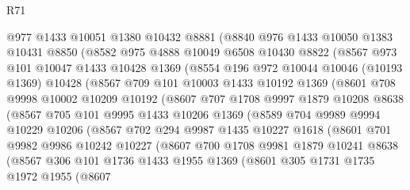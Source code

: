 \begin{lexlean}{R71}
\begin{coremodule}
      @977
      @1433
      @10051
      @1380
      @10432
      @8881
      (@8840
        @976
        @1433
        @10050
        @1383
        @10431
        @8850
        (@8582
          @975
          @4888
          @10049
          @6508
          @10430
          @8822
          (@8567
            @973
            @101
            @10047
            @1433
            @10428
            @1369
            (@8554
              @196
              @972
              @10044
              @10046
              (@10193 @1369)
              @10428
              (@8567
                @709
                @101
                @10003
                @1433
                @10192
                @1369
                (@8601
                  @708
                  @9998
                  @10002
                  @10209
                  @10192
                  (@8607
                    @707
                    @1708
                    @9997
                    @1879
                    @10208
                    @8638
                    (@8567
                      @705
                      @101
                      @9995
                      @1433
                      @10206
                      @1369
                      (@8589
                        @704
                        @9989
                        @9994
                        @10229
                        @10206
                        (@8567
                          @702
                          @294
                          @9987
                          @1435
                          @10227
                          @1618
                          (@8601
                            @701
                            @9982
                            @9986
                            @10242
                            @10227
                            (@8607
                              @700
                              @1708
                              @9981
                              @1879
                              @10241
                              @8638
                              (@8567
                                @306
                                @101
                                @1736
                                @1433
                                @1955
                                @1369
                                (@8601
                                  @305
                                  @1731
                                  @1735
                                  @1972
                                  @1955
                                  (@8607

\end{coremodule}
\end{lexlean}
